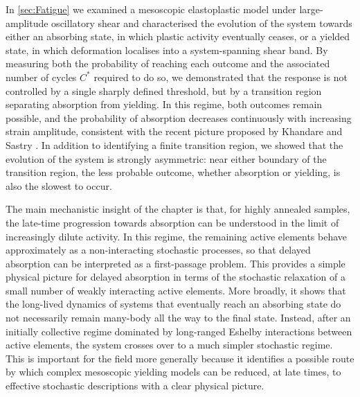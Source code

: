 In \cref{sec:Fatigue} we examined a mesoscopic elastoplastic model under large-amplitude oscillatory shear and characterised the evolution of the system towards either an absorbing state, in which plastic activity eventually ceases, or a yielded state, in which deformation localises into a system-spanning shear band. By measuring both the probability of reaching each outcome and the associated number of cycles $C^*$ required to do so, we demonstrated that the response is not controlled by a single sharply defined threshold, but by a transition region separating absorption from yielding. In this regime, both outcomes remain possible, and the probability of absorption decreases continuously with increasing strain amplitude, consistent with the recent picture proposed by Khandare and Sastry \cite{khandareElastoplasticModellingCyclic2026}. In addition to identifying a finite transition region, we showed that the evolution of the system is strongly asymmetric: near either boundary of the transition region, the less probable outcome, whether absorption or yielding, is also the slowest to occur.


The main mechanistic insight of the chapter is that, for highly annealed samples, the late-time progression towards absorption can be understood in the limit of increasingly dilute activity. In this regime, the remaining active elements behave approximately as a non-interacting stochastic processes, so that delayed absorption can be interpreted as a first-passage problem. This provides a simple physical picture for delayed absorption in terms of the stochastic relaxation of a small number of weakly interacting active elements. More broadly, it shows that the long-lived dynamics of systems that eventually reach an absorbing state do not necessarily remain many-body all the way to the final state. Instead, after an initially collective regime dominated by long-ranged Eshelby interactions between active elements, the system crosses over to a much simpler stochastic regime. This is important for the field more generally because it identifies a possible route by which complex mesoscopic yielding models can be reduced, at late times, to effective stochastic descriptions with a clear physical picture.

